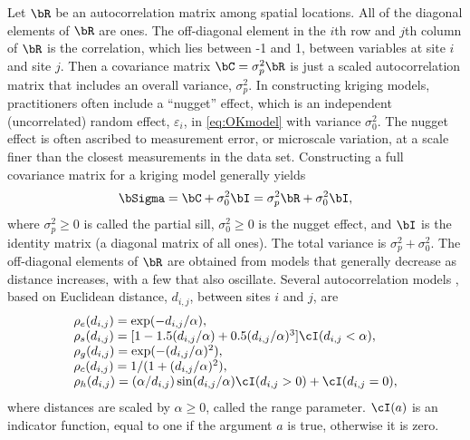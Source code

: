 Let $\bR$ be an autocorrelation matrix among spatial locations.  All of the diagonal elements of $\bR$ are ones. The off-diagonal element in the $i$th row and $j$th column of $\bR$ is the correlation, which lies between -1 and 1, between variables at site $i$ and site $j$.  Then a covariance matrix $\bC = \sigma^2_p\bR$ is just a scaled autocorrelation matrix that includes an overall variance, $\sigma^2_p$.  In constructing kriging models, practitioners often include a ``nugget'' effect, which is an independent (uncorrelated) random effect, $\varepsilon_i$, in \ref{eq:OKmodel} with variance $\sigma_0^2$.  The nugget effect is often ascribed to measurement error, or microscale variation, at a scale finer than the closest measurements in the data set.  Constructing a full covariance matrix for a kriging model generally yields
\begin{equation} \label{eq:bSigma}
	\bSigma = \bC + \sigma^2_0\bI = \sigma^2_p\bR + \sigma^2_0\bI,
\end{equation}
where $\sigma^2_p \ge 0$ is called the partial sill, $\sigma^2_0 \ge 0$ is the nugget effect, and $\bI$ is the identity matrix (a diagonal matrix of all ones). The total variance is $\sigma^2_p + \sigma^2_0$.  The off-diagonal elements of $\bR$ are obtained from models that generally decrease as distance increases, with a few that also oscillate. Several autocorrelation models \citep[][p. 80--93]{Chil:Delf:geos:1999}, based on Euclidean distance, $d_{i,j}$, between sites $i$ and $j$, are
\begin{equation} \label{eq:autocorrModels}
	\begin{array}{l}
  \rho_{e}(d_{i,j}) = \exp(-d_{i,j}/\alpha), \\
  \rho_{s}(d_{i,j}) = [1 - 1.5(d_{i,j}/\alpha) + 0.5(d_{i,j}/\alpha)^3] \cI(d_{i,j} < \alpha), \\
  \rho_{g}(d_{i,j}) = \exp(-(d_{i,j}/\alpha)^2), \\
	\rho_{c}(d_{i,j}) = 1/(1+(d_{i,j}/\alpha)^2), \\
	\rho_{h}(d_{i,j}) = (\alpha/d_{i,j})\sin(d_{i,j}/\alpha)\cI(d_{i,j} > 0) + \cI(d_{i,j} = 0),
	\end{array}
\end{equation}
where distances are scaled by $\alpha \ge 0$, called the range parameter. $\cI(a)$ is an indicator function, equal to one if the argument $a$ is true, otherwise it is zero.

